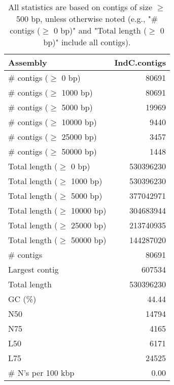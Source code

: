 \documentclass[12pt,a4paper]{article}
\begin{document}
\begin{table}[ht]
\begin{center}
\caption{All statistics are based on contigs of size $\geq$ 500 bp, unless otherwise noted (e.g., "\# contigs ($\geq$ 0 bp)" and "Total length ($\geq$ 0 bp)" include all contigs).}
\begin{tabular}{|l*{1}{|r}|}
\hline
Assembly & IndC.contigs \\ \hline
\# contigs ($\geq$ 0 bp) & 80691 \\ \hline
\# contigs ($\geq$ 1000 bp) & 80691 \\ \hline
\# contigs ($\geq$ 5000 bp) & 19969 \\ \hline
\# contigs ($\geq$ 10000 bp) & 9440 \\ \hline
\# contigs ($\geq$ 25000 bp) & 3457 \\ \hline
\# contigs ($\geq$ 50000 bp) & 1448 \\ \hline
Total length ($\geq$ 0 bp) & 530396230 \\ \hline
Total length ($\geq$ 1000 bp) & 530396230 \\ \hline
Total length ($\geq$ 5000 bp) & 377042971 \\ \hline
Total length ($\geq$ 10000 bp) & 304683944 \\ \hline
Total length ($\geq$ 25000 bp) & 213740935 \\ \hline
Total length ($\geq$ 50000 bp) & 144287020 \\ \hline
\# contigs & 80691 \\ \hline
Largest contig & 607534 \\ \hline
Total length & 530396230 \\ \hline
GC (\%) & 44.44 \\ \hline
N50 & 14794 \\ \hline
N75 & 4165 \\ \hline
L50 & 6171 \\ \hline
L75 & 24525 \\ \hline
\# N's per 100 kbp & 0.00 \\ \hline
\end{tabular}
\end{center}
\end{table}
\end{document}
